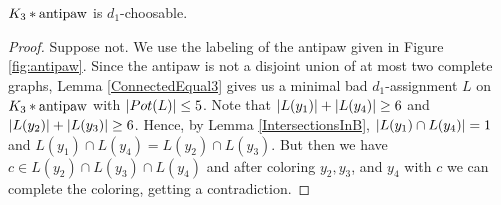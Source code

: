 
\begin{lem}\label{AntiPaw}
$K_3 \mbox{\hspace{2 pt}$\ast$\hspace{2 pt}} \text{antipaw}$ is $d_1$-choosable.
\end{lem}
\begin{proof}
Suppose not. We use the labeling of the antipaw given in
Figure \ref{fig:antipaw}. Since the antipaw is not a disjoint union of at most
two complete graphs, Lemma \ref{ConnectedEqual3} gives us a minimal bad
$d_1$-assignment $L$ on $K_3 \mbox{\hspace{2 pt}$\ast$\hspace{2 pt}} \text{antipaw}$ with $\left|Pot(L)\right| \leq
5$.  Note that $\left|L(y_1)\right| + \left|L(y_4)\right| \geq 6$ and $\left|L(y_2)\right| +
\left|L(y_3)\right| \geq 6$.  Hence, by Lemma \ref{IntersectionsInB}, $\left|L(y_1)
\cap L(y_4)\right| = 1$ and $L(y_1) \cap L(y_4) = L(y_2) \cap L(y_3)$.  But then we
have $c \in L(y_2) \cap L(y_3) \cap L(y_4)$ and after coloring $y_2, y_3$, and
$y_4$ with $c$ we can complete the coloring, getting a contradiction.
\end{proof}

